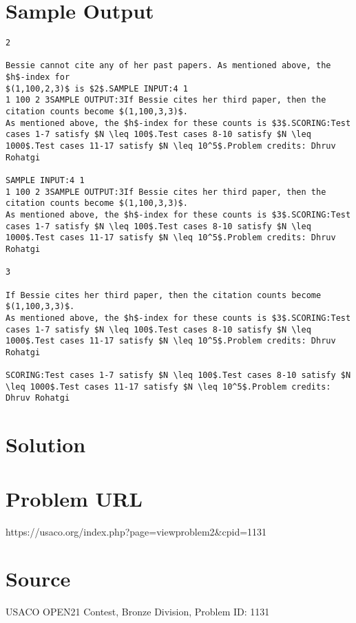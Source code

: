 \documentclass[12pt]{article}
\begin{document}
\section*{Sample Output}
\begin{verbatim}
2

Bessie cannot cite any of her past papers. As mentioned above, the $h$-index for
$(1,100,2,3)$ is $2$.SAMPLE INPUT:4 1
1 100 2 3SAMPLE OUTPUT:3If Bessie cites her third paper, then the citation counts become $(1,100,3,3)$.
As mentioned above, the $h$-index for these counts is $3$.SCORING:Test cases 1-7 satisfy $N \leq 100$.Test cases 8-10 satisfy $N \leq 1000$.Test cases 11-17 satisfy $N \leq 10^5$.Problem credits: Dhruv Rohatgi

SAMPLE INPUT:4 1
1 100 2 3SAMPLE OUTPUT:3If Bessie cites her third paper, then the citation counts become $(1,100,3,3)$.
As mentioned above, the $h$-index for these counts is $3$.SCORING:Test cases 1-7 satisfy $N \leq 100$.Test cases 8-10 satisfy $N \leq 1000$.Test cases 11-17 satisfy $N \leq 10^5$.Problem credits: Dhruv Rohatgi

3

If Bessie cites her third paper, then the citation counts become $(1,100,3,3)$.
As mentioned above, the $h$-index for these counts is $3$.SCORING:Test cases 1-7 satisfy $N \leq 100$.Test cases 8-10 satisfy $N \leq 1000$.Test cases 11-17 satisfy $N \leq 10^5$.Problem credits: Dhruv Rohatgi

SCORING:Test cases 1-7 satisfy $N \leq 100$.Test cases 8-10 satisfy $N \leq 1000$.Test cases 11-17 satisfy $N \leq 10^5$.Problem credits: Dhruv Rohatgi
\end{verbatim}

\section*{Solution}


\section*{Problem URL}
https://usaco.org/index.php?page=viewproblem2&cpid=1131

\section*{Source}
USACO OPEN21 Contest, Bronze Division, Problem ID: 1131
\end{document}
